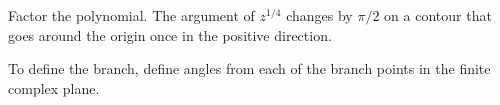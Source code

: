 {%
\begin{Hint}
  \label{hint z4114}
  Factor the polynomial.  The argument of $z^{1/4}$ changes by $\pi / 2$ on 
  a contour that goes around the origin once in the positive direction.
\end{Hint}




\begin{Hint}
  \label{hint zz21}
\end{Hint}





\begin{Hint}
  \label{hint z1z2z3}
  To define the branch, define angles from each of the branch points in the
  finite complex plane.
\end{Hint}




\begin{Hint}
  \label{hint z22z2}
\end{Hint}







\begin{Hint}
  \label{hint pb arccos}
\end{Hint}






\begin{Hint}
  \label{hint bp z12112}
\end{Hint}








\begin{Hint}
  \label{hint linkage}
\end{Hint}







\begin{Hint}
  \label{hint image 2z2}
\end{Hint}









\begin{Hint}
  \label{hint classify z1z2}
\end{Hint}




\begin{Hint}
  \label{hint sinh 0 pi}
\end{Hint}








\raggedbottom
}
